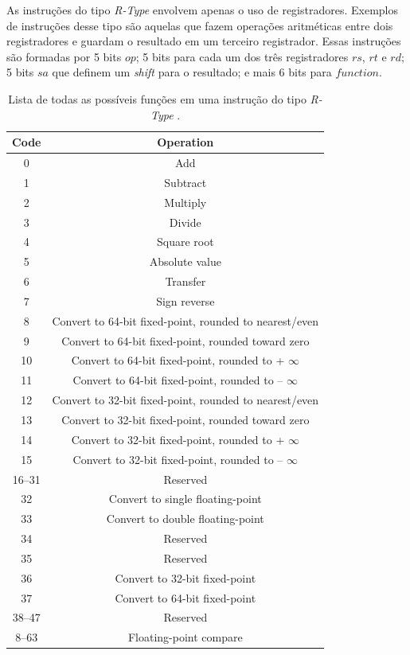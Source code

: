 \documentclass[12pt]{article}
\begin{document}
    As instruções do tipo {\em R-Type} envolvem apenas o uso de 
registradores. Exemplos de instruções desse tipo são aquelas que
fazem operações aritméticas entre dois registradores e guardam o 
resultado em um terceiro registrador. Essas instruções são formadas
por 5 bits $op$; 5 bits para cada um dos três registradores $rs$, $rt$
e $rd$; 5 bits $sa$ que definem um {\em shift} para o resultado; e mais
6 bits para $function$.

\begin{table}[H]
\centering
\label{r-type-table}
\begin{tabular}{|c|c|}
\hline
Code & Operation \\ \hline
0  & Add \\
1  & Subtract \\
2  & Multiply \\
3  & Divide \\
4  & Square root \\
5  & Absolute value \\
6  & Transfer \\
7  & Sign reverse \\
8  & Convert to 64-bit fixed-point, rounded to nearest/even \\
9  & Convert to 64-bit fixed-point, rounded toward zero \\
10 & Convert to 64-bit fixed-point, rounded to + $\infty$ \\
11 & Convert to 64-bit fixed-point, rounded to – $\infty$ \\
12 & Convert to 32-bit fixed-point, rounded to nearest/even \\
13 & Convert to 32-bit fixed-point, rounded toward zero \\
14 & Convert to 32-bit fixed-point, rounded to + $\infty$ \\
15 & Convert to 32-bit fixed-point, rounded to – $\infty$ \\
16–31 & Reserved \\
32 & Convert to single floating-point \\
33 & Convert to double floating-point \\
34 & Reserved \\
35 & Reserved \\
36 & Convert to 32-bit fixed-point \\
37 & Convert to 64-bit fixed-point \\
38–47 & Reserved \\
8–63 & Floating-point compare \\
\hline
\end{tabular}
\caption{Lista de todas as possíveis funções em uma instrução do tipo
{\em R-Type} \cite{vr4300-datasheet}.}

\end{table}
\end{document}
